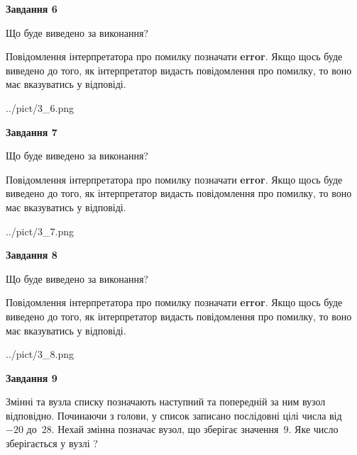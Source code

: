 \documentclass[12pt, ukrainian]{article}
\begin{document}
{\begin {large}
{\begin {center}\textbf{Завдання 6}\end {center}}\par
Що буде виведено за виконання?

Повідомлення інтерпретатора про помилку позначати \textbf{error}.
Якщо щось буде виведено до того, як інтерпретатор видасть повідомлення про помилку, 
то воно має вказуватись у відповіді. \par


\begin{center}
	{../pict/3_6.png}
\end{center}
\newpage

{\begin {center}\textbf{Завдання 7}\end {center}}\par
Що буде виведено за виконання?

Повідомлення інтерпретатора про помилку позначати \textbf{error}.
Якщо щось буде виведено до того, як інтерпретатор видасть повідомлення про помилку, 
то воно має вказуватись у відповіді. \par


\begin{center}
	{../pict/3_7.png}
\end{center}
\newpage

{\begin {center}\textbf{Завдання 8}\end {center}}\par
Що буде виведено за виконання?

Повідомлення інтерпретатора про помилку позначати \textbf{error}.
Якщо щось буде виведено до того, як інтерпретатор видасть повідомлення про помилку, 
то воно має вказуватись у відповіді. \par


\begin{center}
	{../pict/3_8.png}
\end{center}
\newpage

{\begin {center}\textbf{Завдання 9}\end {center}}\par
Змінні  та  вузла списку позначають наступний та попередній за ним вузол відповідно. Починаючи з голови, у список записано послідовні цілі числа від~$-20$ до~$28$. Нехай змінна  позначає вузол, що зберігає значення~$9$.
Яке число зберігається у вузлі  ?\par
\newpage


\end{large}}
\end{document}
